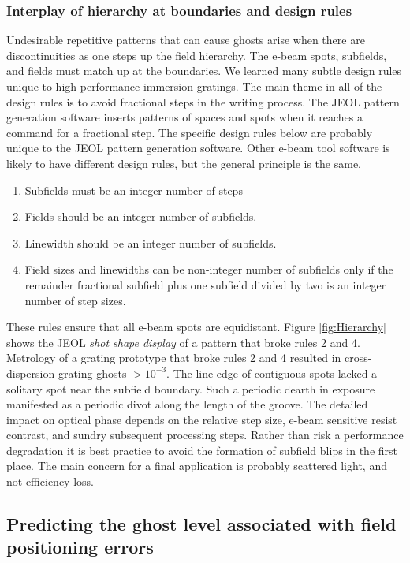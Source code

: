\documentclass[]{spie}  %
\begin{document}
\subsubsection{Interplay of hierarchy at boundaries and design rules}
\label{sec:Boundaries}
Undesirable repetitive patterns that can cause ghosts arise when there are discontinuities as one steps up the field hierarchy.  The e-beam spots, subfields, and fields must match up at the boundaries.  We learned many subtle design rules unique to high performance immersion gratings.  The main theme in all of the design rules is to avoid fractional steps in the writing process.  The JEOL pattern generation software inserts patterns of spaces and spots when it reaches a command for a fractional step.  The specific design rules below are probably unique to the JEOL pattern generation software.  Other e-beam tool software is likely to have different design rules, but the general principle is the same.  
\begin{enumerate}
  \item Subfields must be an integer number of steps
  \item Fields should be an integer number of subfields.  
  \item Linewidth should be an integer number of subfields.
  \item Field sizes and linewidths can be non-integer number of subfields only if the remainder fractional subfield plus one subfield divided by two is an integer number of step sizes.
\end{enumerate}   

These rules ensure that all e-beam spots are equidistant.  Figure \ref{fig:Hierarchy}  shows the JEOL \emph{shot shape display} of a pattern that broke rules 2 and 4.  Metrology of a grating prototype that broke rules 2 and 4 resulted in cross-dispersion grating ghosts $>10^{-3}$.  The line-edge of contiguous spots lacked a solitary spot near the subfield boundary.  Such a periodic dearth in exposure manifested as a periodic divot along the length of the groove.  The detailed impact on optical phase depends on the relative step size, e-beam sensitive resist contrast, and sundry subsequent processing steps.  Rather than risk a performance degradation it is best practice to avoid the formation of subfield blips in the first place.  The main concern for a final application is probably scattered light, and not efficiency loss. 


\subsection{Predicting the ghost level associated with field positioning errors}
\label{sec:Ghosts}
\end{document}

